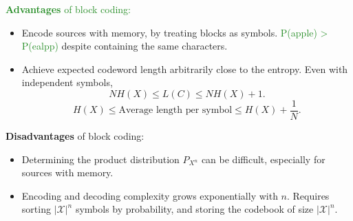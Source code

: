 \textcolor{ForestGreen}{\textbf{Advantages} of block coding:}
\begin{itemize}
  \item Encode sources with memory, by treating blocks as symbols.
    \textcolor{ForestGreen}{P(apple) > P(ealpp)} despite containing the same characters.
  \item Achieve expected codeword length arbitrarily close to the entropy. Even with
    independent symbols,
    \[NH(X)\le L(C)\le NH(X)+1.\] 
    \[H(X)\le \text{Average length per symbol}\le H(X)+\frac{1}{N}.\] 
\end{itemize}
\textcolor{Bittersweet}{\textbf{Disadvantages} of block coding:}
\begin{itemize}
  \item Determining the product distribution $P_{X^n}$ can be difficult,
    especially for sources with memory.
  \item Encoding and decoding complexity grows exponentially with $n$. Requires
    sorting $\left| \mathcal{X} \right| ^{n}$ symbols by probability, and
    storing the codebook of size $\left| \mathcal{X} \right| ^{n}$.
\end{itemize}



